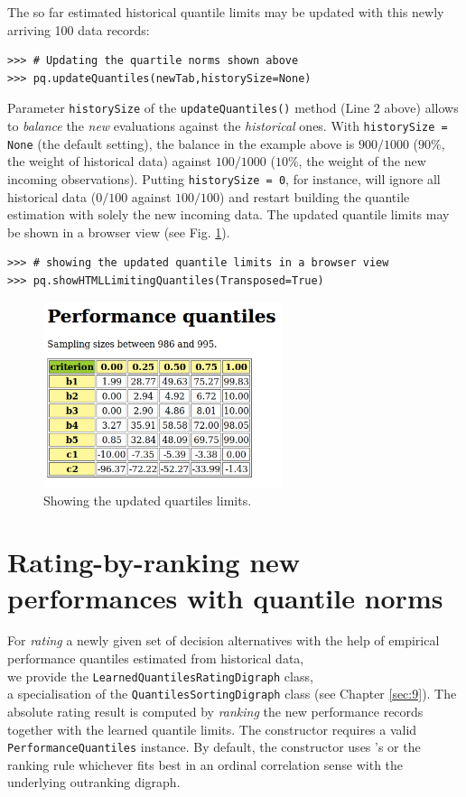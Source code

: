 The so far estimated historical quantile limits may be updated with this newly arriving 100 data records:
\begin{lstlisting}
>>> # Updating the quartile norms shown above 
>>> pq.updateQuantiles(newTab,historySize=None)
\end{lstlisting}
Parameter \texttt{historySize} of the \texttt{updateQuantiles()} method (Line 2 above) allows to \emph{balance} the \emph{new} evaluations against the \emph{historical} ones. With \texttt{historySize = None} (the default setting), the balance in the example above is $900/1000$ ($90\%$, the weight of historical data) against $100/1000$ ($10\%$, the weight of the new incoming observations). Putting \texttt{historySize = 0}, for instance, will ignore all historical data ($0/100$ against $100/100$) and restart building the quantile estimation with solely the new incoming data. The updated quantile limits may be shown in a browser view (see Fig. \ref{fig:10.1}).
\begin{lstlisting}
>>> # showing the updated quantile limits in a browser view
>>> pq.showHTMLLimitingQuantiles(Transposed=True)
\end{lstlisting}
\begin{figure}[h]
\sidecaption[t]
\includegraphics[width=7cm]{Figures/examplePerfQuantiles.png}
\caption{Showing the updated quartiles limits.}
\label{fig:10.1}       %
\end{figure}
    
\section{Rating-by-ranking new performances with quantile norms}
\label{sec:10.3}

For \emph{rating} a newly given set of decision alternatives with the help of empirical performance quantiles estimated from historical data,\\we provide the \texttt{LearnedQuantilesRatingDigraph} class,\\ a specialisation of the \texttt{QuantilesSortingDigraph} class (see Chapter \ref{sec:9}). The absolute rating result is computed by \emph{ranking} the new performance records together with the learned quantile limits. The constructor requires a valid \texttt{PerformanceQuantiles} instance. By default, the constructor uses \Copeland 's or the \NetFlows ranking rule whichever fits best in an ordinal correlation sense with the underlying outranking digraph.

